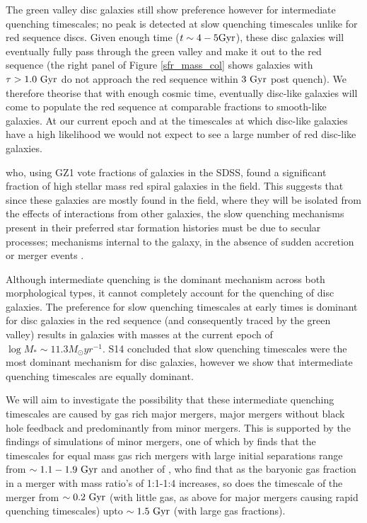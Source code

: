 \documentclass{mn2e}
\begin{document}
The green valley disc galaxies still show preference however for intermediate quenching timescales; no peak is detected at slow quenching timescales unlike for red sequence discs. Given enough time ($t\sim4-5\rm{Gyr}$), these disc galaxies will eventually fully pass through the green valley and make it out to the red sequence (the right panel of Figure \ref{sfr_mass_col} shows galaxies with $\tau > 1.0~\rm{Gyr}$ do not approach the red sequence within $3~\rm{Gyr}$ post quench). We therefore theorise that with enough cosmic time, eventually disc-like galaxies will come to populate the red sequence at comparable fractions to smooth-like galaxies. At our current epoch and at the timescales at which disc-like galaxies have a high likelihood we would not expect to see a large number of red disc-like galaxies. 

\citet{Bamford09} who, using GZ1 vote fractions of galaxies in the SDSS, found a significant fraction of high stellar mass red spiral galaxies in the field. This suggests that since these galaxies are mostly found in the field, where they will be isolated from the effects of interactions from other galaxies, the slow quenching mechanisms present in their preferred star formation histories must be due to secular processes; mechanisms internal to the galaxy, in the absence of sudden accretion or merger events \citep{KK04, Sheth12}.

Although intermediate quenching is the dominant mechanism across both morphological types, it cannot completely account for the quenching of disc galaxies. The preference for slow quenching timescales at early times is dominant for disc galaxies in the red sequence (and consequently traced by the green valley) results in galaxies with masses at the current epoch of $\log M_* \sim 11.3 M_{\odot} yr^{-1}$. S14 concluded that slow quenching timescales were the most dominant mechanism for disc galaxies, however we show that intermediate quenching timescales are equally dominant. 

We will aim to investigate the possibility that these intermediate quenching timescales are caused by gas rich major mergers, major mergers without black hole feedback and predominantly from minor mergers. This is supported by the findings of simulations of minor mergers, one of which by \citet{Lotz08} finds that the timescales for equal mass gas rich mergers with large initial separations range from $\sim 1.1-1.9~\rm{Gyr}$ and another of \citet{Lotz11}, who find that as the baryonic gas fraction in a merger with mass ratio's of 1:1-1:4 increases, so does the timescale of the merger from $\sim0.2~\rm{Gyr}$ (with little gas, as above for major mergers causing rapid quenching timescales) upto $\sim1.5~\rm{Gyr}$ (with large gas fractions). 
\end{document}
